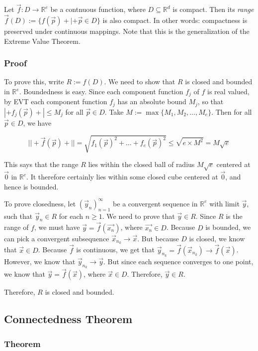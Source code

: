 \documentclass[11 pt, twoside]{article}
\begin{document}
Let $\vec{f} : D \to \mathbb{R}^e$ be a contnuous function, where $D \subseteq
\mathbb{R}^d$ is compact. Then its \textit{range} $\vec{f}(D) := \{f(\vec{p}) +|+
\vec{p} \in D\}$ is also compact. In other words: compactness is preserved under
continuous mappings. Note that this is the generalization of the Extreme Value
Theorem.

\subsubsection{Proof}

To prove this, write $R := f(D)$. We need to show that $R$ is closed and bounded
in $\mathbb{R}^e$. Boundedness is easy. Since each component function $f_j$
of $f$ is real valued, by EVT each component function $f_j$ has an absolute
bound $M_j$, so that $|+f_j(\vec{p})+| \leq M_j$ for all $\vec{p} \in D$. 
Take $M := \max\{M_1, M_2, \dots, M_e\}$. Then for all $\vec{p} \in D$, we have

$$||+\vec{f}(\vec{p})+|| = \sqrt{f_1(\vec{p})^2 + \dots + f_e(\vec{p})^2} \leq
\sqrt{e \times M^2} = M \sqrt{e}$$

This says that the range $R$ lies within the closed ball of radius $M\sqrt{e}$
centered at $\vec{0}$ in $\mathbb{R}^e$. It therefore certainly lies within
some closed cube centered at $\vec{0}$, and hence is bounded.

To prove closedness, let $(\vec{y}_n)_{n = 1}^\infty$ be a convergent sequence in
$\mathbb{R}^e$ with limit $\vec{y}$, such that $\vec{y}_n \in R$ for each $n
\geq 1$. We need to prove that $\vec{y} \in R$. Since $R$ is the range of $f$,
we must have $\vec{y} = \vec{f}(\vec{x_n})$, where $\vec{x_n} \in D$. Because
$D$ is bounded, we can pick a convergent subsequence $\vec{x}_{n_k} \to
\vec{x}$. But because $D$ is closed, we know that $\vec{x} \in D$. Because
$\vec{f}$ is continuous, we get that $\vec{y}_{n_k} = \vec{f}(\vec{x}_{n_k}) \to
\vec{f}(\vec{x})$. However, we know that $\vec{y}_{n_k} \to \vec{y}$. But since
each sequence converges to one point, we know that $\vec{y} = \vec{f}(\vec{x})$,
where $\vec{x} \in D$. Therefore, $\vec{y} \in R$.

Therefore, $R$ is closed and bounded.

\subsection{Connectedness Theorem}

\subsubsection{Theorem}
\end{document}
